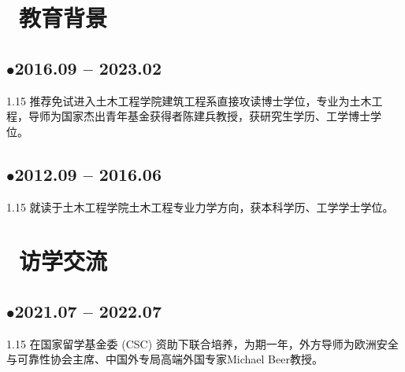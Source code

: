 \documentclass{resume}
\begin{document}
\section{\faGraduationCap\  教育背景}
\subsection{$\bullet$\;\;\textbf{2016.09 -- 2023.02} }
\begin{spacing}{1.15}
推荐免试进入土木工程学院建筑工程系直接攻读博士学位，专业为土木工程，导师为国家杰出青年基金获得者陈建兵教授，获研究生学历、工学博士学位。\
\end{spacing}
\subsection{$\bullet$\;\;\textbf{2012.09 -- 2016.06}}
\begin{spacing}{1.15}
就读于土木工程学院土木工程专业力学方向，获本科学历、工学学士学位。
\end{spacing}

\section{\faPlane\  访学交流}
\subsection{$\bullet$\;\;\textbf{2021.07 -- 2022.07} }
\begin{spacing}{1.15}
在国家留学基金委 (CSC) 资助下联合培养，为期一年，外方导师为欧洲安全与可靠性协会主席、中国外专局高端外国专家\rm{Michael Beer}教授。\
\end{spacing}
\end{document}
